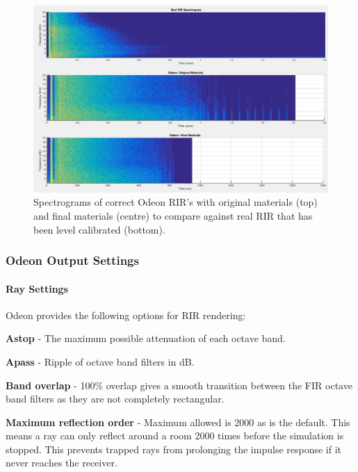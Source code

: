 \documentclass[../../main.tex]{subfiles}
\begin{document}
			\begin{figure}[H]
				\centerline{\includegraphics[scale = 0.4]{Sections/Implementation/Odeon/images/MaterialCompare/NewMaterials/newOdeonComparison.png}}
				\caption{Spectrograms of correct Odeon \ac{RIR}'s with original materials (top) and final materials (centre) to compare against real RIR that has been level calibrated (bottom).}
				\label{compareCorrect}
			\end{figure}

		\subsubsection{Odeon Output Settings}
			\paragraph{Ray Settings}

				Odeon provides the following options for \ac{RIR} rendering:

				\textbf{Astop} - The maximum possible attenuation of each octave band.

				\textbf{Apass} - Ripple of octave band filters in dB.

				\textbf{Band overlap} - 100\% overlap gives a smooth transition between the FIR octave band filters as they are not completely rectangular.

				\textbf{Maximum reflection order} - Maximum allowed is 2000 as is the default. This means a ray can only reflect around a room 2000 times before the simulation is stopped. This prevents trapped rays from prolonging the impulse response if it never reaches the receiver.
\end{document}
